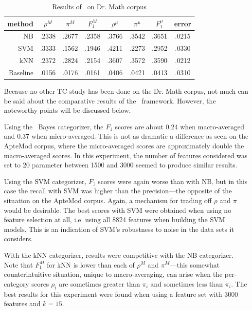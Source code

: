 \begin{table}
\begin{center}
\begin{tabular}{|r c c c c c c c|}
\hline
method    & $\rho^M$ & $\pi^M$ & $F_1^M$ & $\rho^\mu$ & $\pi^\mu$ & $F_1^\mu$ &   error \\
\hline
NB        &   .2338  &  .2677  &  .2358  &  .3766     &  .3542    &  .3651    &  .0215  \\
SVM       &   .3333  &  .1562  &  .1946  &  .4211     &  .2273    &  .2952    &  .0330  \\
kNN       &   .2372  &  .2824  &  .2154  &  .3607     &  .3572    &  .3590    &  .0212  \\
Baseline  &   .0156  &  .0176  &  .0161  &  .0406     &  .0421    &  .0413    &  .0310  \\
\hline
\end{tabular}
\end{center}
\caption{Results of \aicat\ on Dr. Math corpus}
\label{drmath-results}
\end{table}

Because no other TC study has been done on the Dr. Math corpus, not
much can be said about the comparative results of the \aicat\
framework.  However, the noteworthy points will be discussed below.

Using the \naive\ Bayes categorizer, the $F_1$ scores are about 0.24
when macro-averaged and 0.37 when micro-averaged.  This is not as
dramatic a difference as seen on the ApteMod corpus, where the
micro-averaged scores are approximately double the macro-averaged
scores.  In this experiment, the number of features considered was set
to 20%
parameter between 1500 and 3000 seemed to produce similar results.

Using the SVM categorizer, $F_1$ scores were again worse than with NB,
but in this case the recall with SVM was higher than the
precision---the opposite of the situation on the ApteMod corpus.
Again, a mechanism for trading off $\rho$ and $\pi$ would be
desirable.  The best scores with SVM were obtained when using no
feature selection at all, i.e. using all 8824 features when building
the SVM models.  This is an indication of SVM's robustness to noise in
the data sets it considers.

With the kNN categorizer, results were competitive with the NB
categorizer.  Note that $F_1^M$ for kNN is lower than each of $\rho^M$
and $\pi^M$---this somewhat counterintuitive situation, unique to
macro-averaging, can arise when the per-category scores $\rho_i$ are
sometimes greater than $\pi_i$ and sometimes less than $\pi_i$.  The
best results for this experiment were found when using a feature set
with 3000 features and $k=15$.



